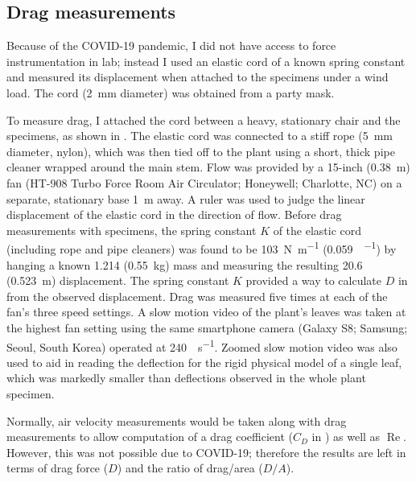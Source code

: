 \subsection{Drag measurements}
Because of the COVID-19 pandemic, I did not have access to force instrumentation in lab; instead I used an elastic cord of a known spring constant and measured its displacement when attached to the specimens under a wind load. The cord (\SI{2}{\milli\meter} diameter) was obtained from a party mask. 

To measure drag, I attached the cord between a heavy, stationary chair and the specimens, as shown in . The elastic cord was connected to a stiff rope (\SI{5}{\milli\meter} diameter, nylon), which was then tied off to the plant using a short, thick pipe cleaner wrapped around the main stem. Flow was provided by a 15-inch (\SI{0.38}{\meter}) fan (HT-908 Turbo Force Room Air Circulator; Honeywell; Charlotte, NC) on a separate, stationary base \SI{1}{\meter} away. A ruler was used to judge the linear displacement of the elastic cord in the direction of flow.  Before drag measurements with specimens, the spring constant $K$ of the elastic cord (including rope and pipe cleaners) was found to be \SI{103}{\newton\per\meter} (\SI{0.059}{\poundforce\per\inch}) by hanging a known \SI{1.214}{\pound} (\SI{0.55}{\kilo\gram}) mass and measuring the resulting \SI{20.6}{\inch} (\SI{0.523}{\meter}) displacement. The spring constant $K$ provided a way to calculate $D$ in  from the observed displacement. Drag was measured five times at each of the fan's three speed settings. A slow motion video of the plant's leaves was taken at the highest fan setting using the same smartphone camera (Galaxy S8; Samsung; Seoul, South Korea) operated at \SI{240}{\frame\per\second}. Zoomed slow motion video was also used to aid in reading the deflection for the rigid physical model of a single leaf, which was markedly smaller than deflections observed in the whole plant specimen. 

Normally, air velocity measurements would be taken along with drag measurements to allow computation of a drag coefficient ($C_D$ in ) as well as $\operatorname{Re}$. However, this was not possible due to COVID-19; therefore the results are left in terms of drag force ($D$) and the ratio of drag/area ($D/A$). 

